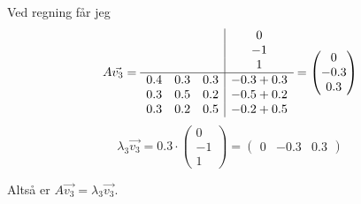Ved regning får jeg
$$A\vec{v_3} = \begin{array}{c c c|c}
                   & & & 0 \\
                   & & & -1 \\
                   & & & 1 \\
                  \hline
                  0.4 & 0.3 & 0.3 & -0.3 + 0.3 \\
                  0.3 & 0.5 & 0.2 & -0.5 + 0.2 \\
                  0.3 & 0.2 & 0.5 & -0.2 + 0.5
                  \end{array}
             = \begin{pmatrix} 0 \\ -0.3 \\ 0.3 \end{pmatrix}$$
$$\lambda_3\vec{v_3} = 0.3\cdot \begin{pmatrix} 0 \\ -1 \\ 1 \end{pmatrix}
                     = \begin{pmatrix} 0 & -0.3 & 0.3 \end{pmatrix}$$

Altså er $A\vec{v_3} = \lambda_3\vec{v_3}$.
